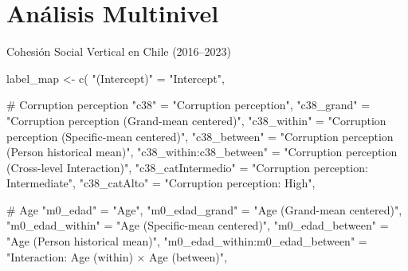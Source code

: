 \documentclass[
  spanish,
  a4paper,
  oneside]{scrbook}
\newenvironment{Shaded}{\begin{snugshade}}{\end{snugshade}}
\newcommand{\CommentTok}[1]{\textcolor[rgb]{0.37,0.37,0.37}{#1}}
\newcommand{\FunctionTok}[1]{\textcolor[rgb]{0.28,0.35,0.67}{#1}}
\newcommand{\NormalTok}[1]{\textcolor[rgb]{0.00,0.23,0.31}{#1}}
\newcommand{\OtherTok}[1]{\textcolor[rgb]{0.00,0.23,0.31}{#1}}
\newcommand{\StringTok}[1]{\textcolor[rgb]{0.13,0.47,0.30}{#1}}
\begin{document}
\chapter{Análisis Multinivel}\label{anuxe1lisis-multinivel}

Cohesión Social Vertical en Chile (2016--2023)

\hfill\break

\begin{Shaded}
\begin{Highlighting}[]
\NormalTok{label\_map }\OtherTok{\textless{}{-}} \FunctionTok{c}\NormalTok{(}
  \StringTok{"(Intercept)"}            \OtherTok{=} \StringTok{"Intercept"}\NormalTok{,}
  
  \CommentTok{\# Corruption perception}
  \StringTok{"c38"}                    \OtherTok{=} \StringTok{"Corruption perception"}\NormalTok{,}
  \StringTok{"c38\_grand"}              \OtherTok{=} \StringTok{"Corruption perception (Grand{-}mean centered)"}\NormalTok{,}
  \StringTok{"c38\_within"}             \OtherTok{=} \StringTok{"Corruption perception (Specific{-}mean centered)"}\NormalTok{,}
  \StringTok{"c38\_between"}            \OtherTok{=} \StringTok{"Corruption perception (Person historical mean)"}\NormalTok{,}
  \StringTok{"c38\_within:c38\_between"} \OtherTok{=} \StringTok{"Corruption perception (Cross{-}level Interaction)"}\NormalTok{,}
  \StringTok{"c38\_catIntermedio"}      \OtherTok{=} \StringTok{"Corruption perception: Intermediate"}\NormalTok{,}
  \StringTok{"c38\_catAlto"}            \OtherTok{=} \StringTok{"Corruption perception: High"}\NormalTok{,}

  \CommentTok{\# Age}
  \StringTok{"m0\_edad"}                \OtherTok{=} \StringTok{"Age"}\NormalTok{,}
  \StringTok{"m0\_edad\_grand"}          \OtherTok{=} \StringTok{"Age (Grand{-}mean centered)"}\NormalTok{,}
  \StringTok{"m0\_edad\_within"}         \OtherTok{=} \StringTok{"Age (Specific{-}mean centered)"}\NormalTok{,}
  \StringTok{"m0\_edad\_between"}        \OtherTok{=} \StringTok{"Age (Person historical mean)"}\NormalTok{,}
  \StringTok{"m0\_edad\_within:m0\_edad\_between"} \OtherTok{=} \StringTok{"Interaction: Age (within) × Age (between)"}\NormalTok{,}


\end{Highlighting}
\end{Shaded}
\end{document}
